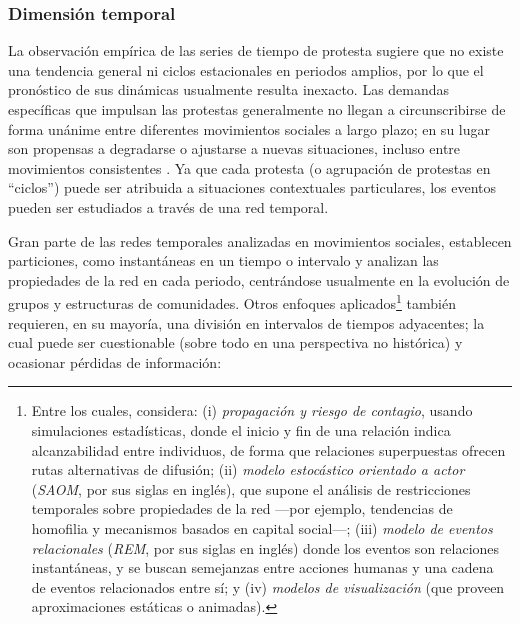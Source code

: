 \documentclass[letterpaper, 11pt]{book}
\theoremstyle{definition}
\theoremstyle{remark}
\begin{document}
\subsubsection{Dimensión temporal}
\label{subsubsec:DimensionTemporal}

La observación empírica de las series de tiempo de protesta sugiere que no existe una tendencia general ni ciclos estacionales en periodos amplios, por lo que el pronóstico de sus dinámicas usualmente resulta inexacto. 
Las demandas específicas que impulsan las protestas generalmente no llegan a circunscribirse de forma unánime entre diferentes movimientos sociales a largo plazo; en su lugar son propensas a degradarse o ajustarse a nuevas situaciones, incluso entre movimientos consistentes \citep[174]{1993_BrmanEvtt_StructureSocialProtest}. 
Ya que cada protesta (o agrupación de protestas en ``ciclos'') puede ser atribuida a situaciones contextuales particulares, los eventos pueden ser estudiados a través de una red temporal. 

Gran parte de las redes temporales analizadas en movimientos sociales, establecen particiones, como instantáneas en un tiempo o intervalo y analizan las propiedades de la red en cada periodo, centrándose usualmente en la evolución de grupos y estructuras de comunidades. 
Otros enfoques aplicados\footnote{
    Entre los cuales, \citet{2017_Broccatelli_BipartiteTemporal} considera: 
    (i) \emph{propagación y riesgo de contagio}, usando simulaciones estadísticas, donde el inicio y fin de una relación indica alcanzabilidad entre individuos, de forma que relaciones superpuestas ofrecen rutas alternativas de difusión; 
    (ii) \emph{modelo estocástico orientado a actor} (\emph{SAOM}, por sus siglas en inglés), que supone el análisis de restricciones temporales sobre propiedades de la red ---por ejemplo, tendencias de homofilia y mecanismos basados en capital social---; 
    (iii) \emph{modelo de eventos relacionales} (\emph{REM}, por sus siglas en inglés) donde los eventos son relaciones instantáneas, y se buscan semejanzas entre acciones humanas y una cadena de eventos relacionados entre sí; 
    y (iv) \emph{modelos de visualización} (que proveen aproximaciones estáticas o animadas). 
} también requieren, en su mayoría, una división en intervalos de tiempos adyacentes; la cual puede ser cuestionable (sobre todo en una perspectiva no histórica) y ocasionar pérdidas de información: 
\end{document}

